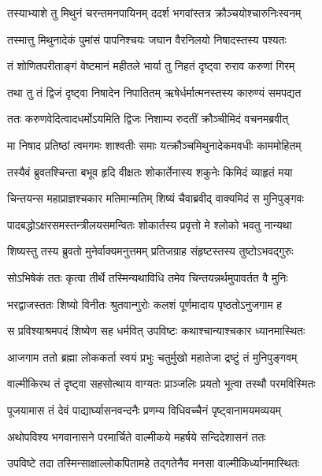 \twolineshloka
{तस्याभ्याशे तु मिथुनं चरन्तमनपायिनम्}
{ददर्श भगवांस्तत्र क्रौञ्चयोश्चारुनिःस्वनम्} %

\twolineshloka
{तस्मात्तु मिथुनादेकं पुमांसं पापनिश्चयः}
{जघान वैरनिलयो निषादस्तस्य पश्यतः} %

\twolineshloka
{तं शोणितपरीताङ्गं वेष्टमानं महीतले}
{भार्या तु निहतं दृष्ट्वा रुराव करुणां गिरम्} %

\twolineshloka
{तथा तु तं द्विजं दृष्ट्वा निषादेन निपातितम्}
{ऋषेर्धर्मात्मनस्तस्य कारुण्यं समपद्यत} %

\twolineshloka
{ततः करुणवेदित्वादधर्मोऽयमिति द्विजः}
{निशाम्य रुदतीं क्रौञ्चीमिदं वचनमब्रवीत्} %

\twolineshloka
{मा निषाद प्रतिष्ठां त्वमगमः शाश्वतीः समाः}
{यत्क्रौञ्चमिथुनादेकमवधीः काममोहितम्} %

\twolineshloka
{तस्यैवं ब्रुवतश्चिन्ता बभूव हृदि वीक्षतः}
{शोकार्तेनास्य शकुनेः किमिदं व्याहृतं मया} %

\twolineshloka
{चिन्तयन्स महाप्राज्ञश्चकार मतिमान्मतिम्}
{शिष्यं चैवाब्रवीद् वाक्यमिदं स मुनिपुङ्गवः} %

\twolineshloka
{पादबद्धोऽक्षरसमस्तन्त्रीलयसमन्वितः}
{शोकार्तस्य प्रवृत्तो मे श्लोको भवतु नान्यथा} %

\twolineshloka
{शिष्यस्तु तस्य ब्रुवतो मुनेर्वाक्यमनुत्तमम्}
{प्रतिजग्राह संहृष्टस्तस्य तुष्टोऽभवद्गुरुः} %

\twolineshloka
{सोऽभिषेकं ततः कृत्वा तीर्थे तस्मिन्यथाविधि}
{तमेव चिन्तयन्नर्थमुपावर्तत वै मुनिः} %

\twolineshloka
{भरद्वाजस्ततः शिष्यो विनीतः श्रुतवान्गुरोः}
{कलशं पूर्णमादाय पृष्ठतोऽनुजगाम ह} %

\twolineshloka
{स प्रविश्याश्रमपदं शिष्येण सह धर्मवित्}
{उपविष्टः कथाश्चान्याश्चकार ध्यानमास्थितः} %

\twolineshloka
{आजगाम ततो ब्रह्मा लोककर्ता स्वयं प्रभुः}
{चतुर्मुखो महातेजा द्रष्टुं तं मुनिपुङ्गवम्} %

\twolineshloka
{वाल्मीकिरथ तं दृष्ट्वा सहसोत्थाय वाग्यतः}
{प्राञ्जलिः प्रयतो भूत्वा तस्थौ परमविस्मितः} %

\twolineshloka
{पूजयामास तं देवं पाद्यार्घ्यासनवन्दनैः}
{प्रणम्य विधिवच्चैनं पृष्ट्वानामयमव्ययम्} %

\twolineshloka
{अथोपविश्य भगवानासने परमार्चिते}
{वाल्मीकये महर्षये सन्दिदेशासनं ततः} %

\twolineshloka
{उपविष्टे तदा तस्मिन्साक्षाल्लोकपितामहे}
{तद्गतेनैव मनसा वाल्मीकिर्ध्यानमास्थितः} %

